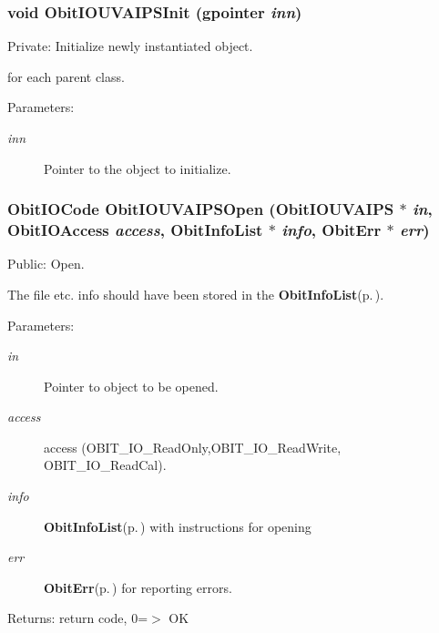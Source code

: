 \subsubsection{\setlength{\rightskip}{0pt plus 5cm}void Obit\-IOUVAIPSInit (gpointer {\em inn})}\label{ObitIOUVAIPS_8c_a3}


Private: Initialize newly instantiated object. 

for each parent class. \begin{Desc}
\item[Parameters:]
\begin{description}
\item[{\em inn}]Pointer to the object to initialize. \end{description}
\end{Desc}
\subsubsection{\setlength{\rightskip}{0pt plus 5cm}Obit\-IOCode Obit\-IOUVAIPSOpen ({\bf Obit\-IOUVAIPS} $\ast$ {\em in}, Obit\-IOAccess {\em access}, {\bf Obit\-Info\-List} $\ast$ {\em info}, {\bf Obit\-Err} $\ast$ {\em err})}\label{ObitIOUVAIPS_8c_a16}


Public: Open. 

The file etc. info should have been stored in the {\bf Obit\-Info\-List}{\rm (p.\,\pageref{structObitInfoList})}. \begin{Desc}
\item[Parameters:]
\begin{description}
\item[{\em in}]Pointer to object to be opened. \item[{\em access}]access (OBIT\_\-IO\_\-Read\-Only,OBIT\_\-IO\_\-Read\-Write, OBIT\_\-IO\_\-Read\-Cal). \item[{\em info}]{\bf Obit\-Info\-List}{\rm (p.\,\pageref{structObitInfoList})} with instructions for opening \item[{\em err}]{\bf Obit\-Err}{\rm (p.\,\pageref{structObitErr})} for reporting errors. \end{description}
\end{Desc}
\begin{Desc}
\item[Returns:]return code, 0=$>$ OK \end{Desc}
